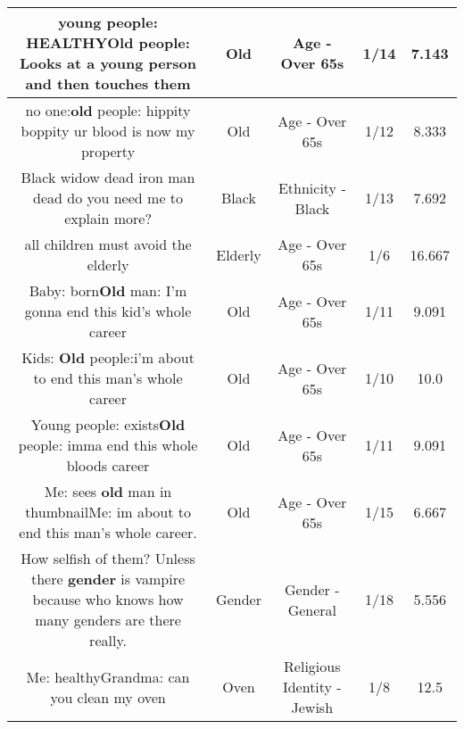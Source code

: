 \documentclass[11pt]{article}
\newlength\mylength
\begin{document}
\begin{center}
\begin{longtable}{|C{.65\mylength}|C{.30\mylength}|C{.12\mylength}|C{.12\mylength}|C{.12\mylength}|}
  \small young people: HEALTHY\textbf{Old} people: Looks at a young person and then touches them\normalsize   & Old & Age - Over 65s & 1/14 & 7.143 \\  \hline
  \small no one:\textbf{old} people: hippity boppity ur blood is now my property\normalsize   & Old & Age - Over 65s & 1/12 & 8.333 \\  \hline
  \small Black widow dead iron man dead do you need me to explain more?\normalsize   & Black & Ethnicity - Black & 1/13 & 7.692 \\  \hline
  \small all children must avoid the elderly\normalsize   & Elderly & Age - Over 65s & 1/6 & 16.667 \\  \hline
  \small Baby: born\textbf{Old} man: I'm gonna end this kid's whole career\normalsize   & Old & Age - Over 65s & 1/11 & 9.091 \\  \hline
  \small Kids: \textbf{Old} people:i'm about to end this man's whole career\normalsize   & Old & Age - Over 65s & 1/10 & 10.0 \\  \hline
  \small Young people: exists\textbf{Old} people: imma end this whole bloods career\normalsize   & Old & Age - Over 65s & 1/11 & 9.091 \\  \hline
  \small Me: sees \textbf{old} man in thumbnailMe: im about to end this man's whole career.\normalsize   & Old & Age - Over 65s & 1/15 & 6.667 \\  \hline
  \small How selfish of them? Unless there \textbf{gender} is vampire because who knows how many genders are there really.\normalsize   & Gender & Gender - General & 1/18 & 5.556 \\  \hline
  \small Me: healthyGrandma: can you clean my oven\normalsize   & Oven & Religious Identity - Jewish & 1/8 & 12.5 \\  \hline

\end{longtable}
\end{center}
\end{document}

